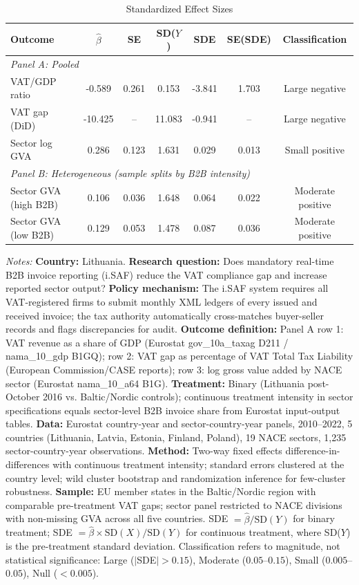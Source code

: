 \begin{table}[t]
\centering
\caption{Standardized Effect Sizes}
\label{tab:sde}
\small
\begin{tabular}{lcccccc}
\hline\hline
Outcome & $\hat{\beta}$ & SE & SD($Y$) & SDE & SE(SDE) & Classification \\
\hline
\multicolumn{7}{l}{\textit{Panel A: Pooled}} \\[3pt]
VAT/GDP ratio & -0.589 & 0.261 & 0.153 & -3.841 & 1.703 & Large negative \\
VAT gap (DiD) & -10.425 & -- & 11.083 & -0.941 & -- & Large negative \\
Sector log GVA & 0.286 & 0.123 & 1.631 & 0.029 & 0.013 & Small positive \\
\hline
\multicolumn{7}{l}{\textit{Panel B: Heterogeneous (sample splits by B2B intensity)}} \\[3pt]
Sector GVA (high B2B) & 0.106 & 0.036 & 1.648 & 0.064 & 0.022 & Moderate positive \\
Sector GVA (low B2B) & 0.129 & 0.053 & 1.478 & 0.087 & 0.036 & Moderate positive \\
\hline\hline
\end{tabular}
\begin{tablenotes}
\item \textit{Notes:} \textbf{Country:} Lithuania. \textbf{Research question:} Does mandatory real-time B2B invoice reporting (i.SAF) reduce the VAT compliance gap and increase reported sector output? \textbf{Policy mechanism:} The i.SAF system requires all VAT-registered firms to submit monthly XML ledgers of every issued and received invoice; the tax authority automatically cross-matches buyer-seller records and flags discrepancies for audit. \textbf{Outcome definition:} Panel A row 1: VAT revenue as a share of GDP (Eurostat gov\_10a\_taxag D211 / nama\_10\_gdp B1GQ); row 2: VAT gap as percentage of VAT Total Tax Liability (European Commission/CASE reports); row 3: log gross value added by NACE sector (Eurostat nama\_10\_a64 B1G). \textbf{Treatment:} Binary (Lithuania post-October 2016 vs. Baltic/Nordic controls); continuous treatment intensity in sector specifications equals sector-level B2B invoice share from Eurostat input-output tables. \textbf{Data:} Eurostat country-year and sector-country-year panels, 2010--2022, 5 countries (Lithuania, Latvia, Estonia, Finland, Poland), 19 NACE sectors, 1,235 sector-country-year observations. \textbf{Method:} Two-way fixed effects difference-in-differences with continuous treatment intensity; standard errors clustered at the country level; wild cluster bootstrap and randomization inference for few-cluster robustness. \textbf{Sample:} EU member states in the Baltic/Nordic region with comparable pre-treatment VAT gaps; sector panel restricted to NACE divisions with non-missing GVA across all five countries. SDE $= \hat{\beta} / \text{SD}(Y)$ for binary treatment; SDE $= \hat{\beta} \times \text{SD}(X) / \text{SD}(Y)$ for continuous treatment, where SD($Y$) is the pre-treatment standard deviation. Classification refers to magnitude, not statistical significance: Large ($|$SDE$| > 0.15$), Moderate ($0.05$--$0.15$), Small ($0.005$--$0.05$), Null ($< 0.005$).
\end{tablenotes}
\end{table}
